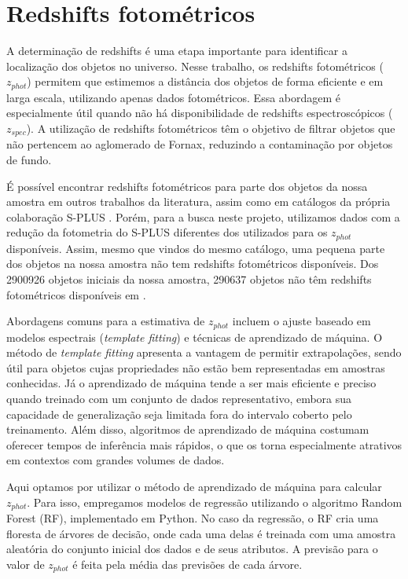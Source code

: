 \section{Redshifts fotométricos}\label{sec:zphot}

A determinação de redshifts é uma etapa importante para identificar a localização dos objetos no universo. Nesse trabalho, os redshifts fotométricos (\textit{$z_{phot}$}) permitem que estimemos a distância dos objetos de forma eficiente e em larga escala, utilizando apenas dados fotométricos. Essa abordagem é especialmente útil quando não há disponibilidade de redshifts espectroscópicos (\textit{$z_{spec}$}). A utilização de redshifts fotométricos têm o objetivo de filtrar objetos que não pertencem ao aglomerado de Fornax, reduzindo a contaminação por objetos de fundo.

É possível encontrar redshifts fotométricos para parte dos objetos da nossa amostra em outros trabalhos da literatura, assim como em catálogos da própria colaboração S-PLUS \citep{erik_photoz_2024}. Porém, para a busca neste projeto, utilizamos dados com a redução da fotometria do S-PLUS diferentes dos utilizados para os \textit{$z_{phot}$} disponíveis. Assim, mesmo que vindos do mesmo catálogo, uma pequena parte dos objetos na nossa amostra não tem redshifts fotométricos disponíveis. Dos 2900926 objetos iniciais da nossa amostra, 290637 objetos não têm redshifts fotométricos disponíveis em \citep{erik_photoz_2024}.

Abordagens comuns para a estimativa de \textit{$z_{phot}$} incluem o ajuste baseado em modelos espectrais (\textit{template fitting}) e técnicas de aprendizado de máquina. O método de \textit{template fitting} apresenta a vantagem de permitir extrapolações, sendo útil para objetos cujas propriedades não estão bem representadas em amostras conhecidas. Já o aprendizado de máquina tende a ser mais eficiente e preciso quando treinado com um conjunto de dados representativo, embora sua capacidade de generalização seja limitada fora do intervalo coberto pelo treinamento. Além disso, algoritmos de aprendizado de máquina costumam oferecer tempos de inferência mais rápidos, o que os torna especialmente atrativos em contextos com grandes volumes de dados.

Aqui optamos por utilizar o método de aprendizado de máquina para calcular \textit{$z_{phot}$}. Para isso, empregamos modelos de regressão utilizando o algoritmo Random Forest (RF), implementado em Python. No caso da regressão, o RF cria uma floresta de árvores de decisão, onde cada uma delas é treinada com uma amostra aleatória do conjunto inicial dos dados e de seus atributos. A previsão para o valor de \textit{$z_{phot}$} é feita pela média das previsões de cada árvore.

